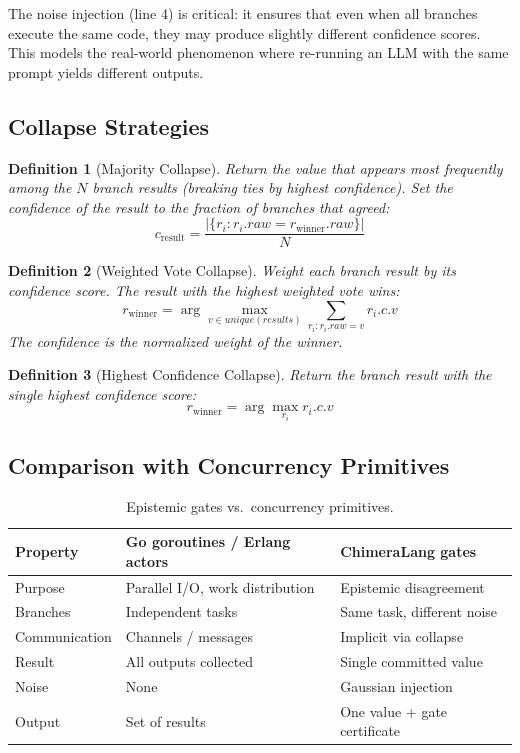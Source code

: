 \documentclass[11pt,a4paper]{article}
\newtheorem{definition}{Definition}[section]
\begin{document}
The noise injection (line 4) is critical: it ensures that even when all branches
execute the same code, they may produce slightly different confidence scores.
This models the real-world phenomenon where re-running an LLM with the same
prompt yields different outputs.

\subsection{Collapse Strategies}

\begin{definition}[Majority Collapse]
Return the value that appears most frequently among the $N$ branch results
(breaking ties by highest confidence). Set the confidence of the result to the
fraction of branches that agreed:
\[
  c_{\text{result}} = \frac{|\{r_i : r_i.\mathit{raw} = r_{\text{winner}}.\mathit{raw}\}|}{N}
\]
\end{definition}

\begin{definition}[Weighted Vote Collapse]
Weight each branch result by its confidence score. The result with the highest
weighted vote wins:
\[
  r_{\text{winner}} = \arg\max_{v \in \mathit{unique}(\mathit{results})}
  \sum_{r_i : r_i.\mathit{raw} = v} r_i.c.v
\]
The confidence is the normalized weight of the winner.
\end{definition}

\begin{definition}[Highest Confidence Collapse]
Return the branch result with the single highest confidence score:
\[
  r_{\text{winner}} = \arg\max_{r_i} r_i.c.v
\]
\end{definition}

\subsection{Comparison with Concurrency Primitives}

\begin{table}[H]
\centering
\caption{Epistemic gates vs.\ concurrency primitives.}
\label{tab:gatecomp}
\begin{tabular}{@{}lll@{}}
\toprule
\textbf{Property} & \textbf{Go goroutines / Erlang actors} & \textbf{ChimeraLang gates} \\
\midrule
Purpose       & Parallel I/O, work distribution & Epistemic disagreement \\
Branches      & Independent tasks               & Same task, different noise \\
Communication & Channels / messages              & Implicit via collapse \\
Result        & All outputs collected            & Single committed value \\
Noise         & None                             & Gaussian injection \\
Output        & Set of results                   & One value + gate certificate \\
\bottomrule
\end{tabular}
\end{table}
\end{document}

